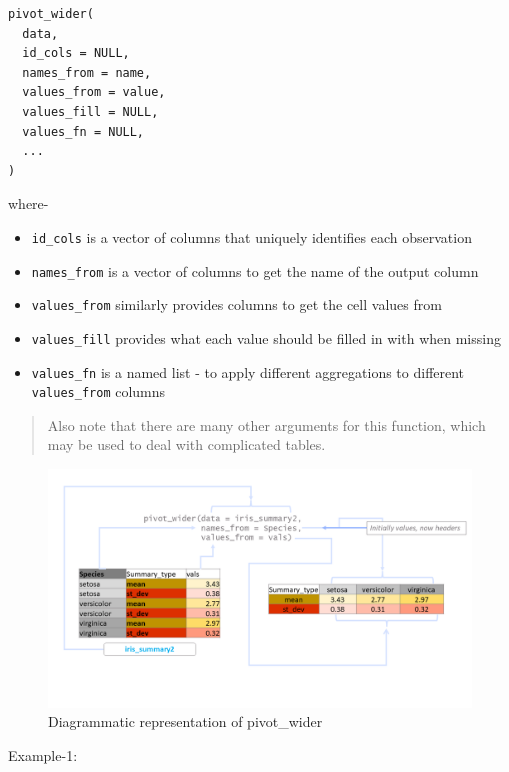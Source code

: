 \documentclass[
]{book}
\providecommand{\tightlist}{%
  \setlength{\itemsep}{0pt}\setlength{\parskip}{0pt}}
\begin{document}
\begin{verbatim}
pivot_wider(
  data,
  id_cols = NULL,
  names_from = name,
  values_from = value,
  values_fill = NULL,
  values_fn = NULL,
  ...
)
\end{verbatim}

where-

\begin{itemize}
\tightlist
\item
  \texttt{id\_cols} is a vector of columns that uniquely identifies each observation
\item
  \texttt{names\_from} is a vector of columns to get the name of the output column
\item
  \texttt{values\_from} similarly provides columns to get the cell values from
\item
  \texttt{values\_fill} provides what each value should be filled in with when missing
\item
  \texttt{values\_fn} is a named list - to apply different aggregations to different \texttt{values\_from} columns
\end{itemize}

\begin{quote}
Also note that there are many other arguments for this function, which may be used to deal with complicated tables.
\end{quote}

\begin{figure}

{\centering \includegraphics[width=0.99\linewidth]{images/pivot_wider} 

}

\caption{Diagrammatic representation of pivot\_wider}\label{fig:pwide}
\end{figure}

Example-1:
\end{document}
